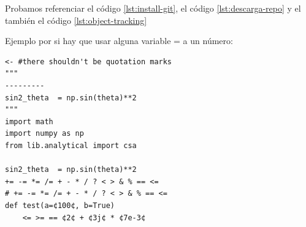 Probamos referenciar el código \ref{lst:install-git}, el código \ref{lst:descarga-repo} y el también el código \ref{lst:object-tracking}

Ejemplo por si hay que usar alguna variable = a un número:

\begin{lstlisting}[language=iPython]
<- #there shouldn't be quotation marks
"""
---------
sin2_theta  = np.sin(theta)**2
"""
import math
import numpy as np
from lib.analytical import csa

sin2_theta  = np.sin(theta)**2
+= -= *= /= + - * / ? < > & % == <=
# += -= *= /= + - * / ? < > & % == <=
def test(a=¢100¢, b=True)
    <= >= == ¢2¢ + ¢3j¢ * ¢7e-3¢
\end{lstlisting}


